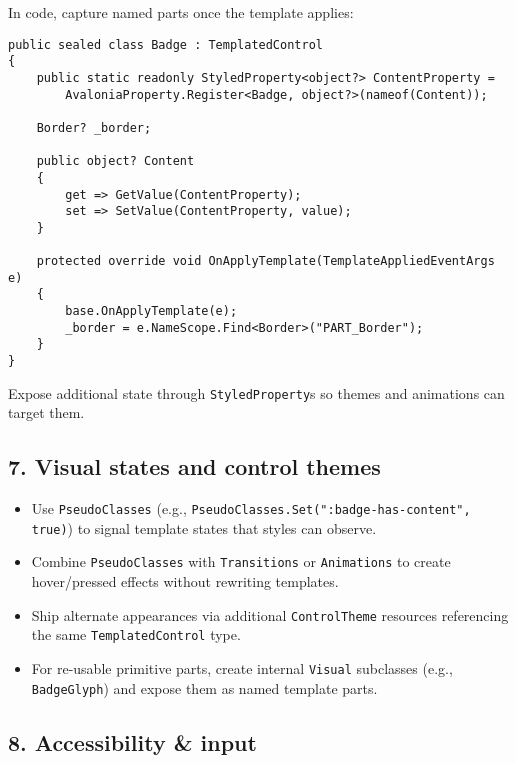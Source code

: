 In code, capture named parts once the template applies:

\begin{lstlisting}
public sealed class Badge : TemplatedControl
{
    public static readonly StyledProperty<object?> ContentProperty =
        AvaloniaProperty.Register<Badge, object?>(nameof(Content));

    Border? _border;

    public object? Content
    {
        get => GetValue(ContentProperty);
        set => SetValue(ContentProperty, value);
    }

    protected override void OnApplyTemplate(TemplateAppliedEventArgs e)
    {
        base.OnApplyTemplate(e);
        _border = e.NameScope.Find<Border>("PART_Border");
    }
}
\end{lstlisting}

Expose additional state through
\passthrough{\lstinline!StyledProperty!}s so themes and animations can
target them.

\subsection{7. Visual states and control
themes}\label{visual-states-and-control-themes}

\begin{itemize}
\tightlist
\item
  Use \passthrough{\lstinline!PseudoClasses!} (e.g.,
  \passthrough{\lstinline!PseudoClasses.Set(":badge-has-content", true)!})
  to signal template states that styles can observe.
\item
  Combine \passthrough{\lstinline!PseudoClasses!} with
  \passthrough{\lstinline!Transitions!} or
  \passthrough{\lstinline!Animations!} to create hover/pressed effects
  without rewriting templates.
\item
  Ship alternate appearances via additional
  \passthrough{\lstinline!ControlTheme!} resources referencing the same
  \passthrough{\lstinline!TemplatedControl!} type.
\item
  For re-usable primitive parts, create internal
  \passthrough{\lstinline!Visual!} subclasses (e.g.,
  \passthrough{\lstinline!BadgeGlyph!}) and expose them as named
  template parts.
\end{itemize}

\subsection{8. Accessibility \& input}\label{accessibility-input}

